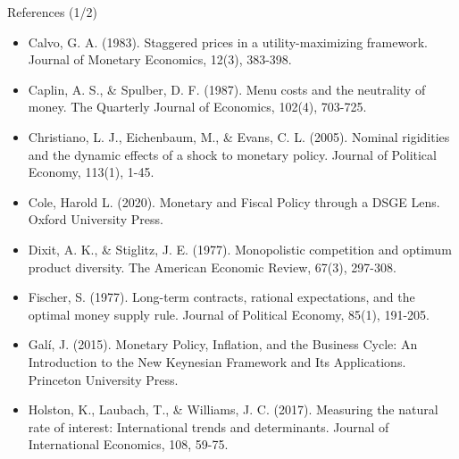 \documentclass[10pt,c,aspectratio=1610,handout]{beamer}
\begin{document}
\begin{frame}{References (1/2)}%
  \begin{scriptsize}%
    \begin{itemize}%
      \item[$\blacktriangleright$] Calvo, G. A. (1983). Staggered prices in a utility-maximizing framework. Journal of Monetary Economics, 12(3), 383-398.%
      \item[$\blacktriangleright$] Caplin, A. S., \& Spulber, D. F. (1987). Menu costs and the neutrality of money. The Quarterly Journal of Economics, 102(4), 703-725.%
      \item[$\blacktriangleright$] Christiano, L. J., Eichenbaum, M., \& Evans, C. L. (2005). Nominal rigidities and the dynamic effects of a shock to monetary policy. Journal of Political Economy, 113(1), 1-45.%
      \item[$\blacktriangleright$] Cole, Harold L. (2020). Monetary and Fiscal Policy through a DSGE Lens. Oxford University Press.%
      \item[$\blacktriangleright$] Dixit, A. K., \& Stiglitz, J. E. (1977). Monopolistic competition and optimum product diversity. The American Economic Review, 67(3), 297-308.%
      \item[$\blacktriangleright$] Fischer, S. (1977). Long-term contracts, rational expectations, and the optimal money supply rule. Journal of Political Economy, 85(1), 191-205.%
      \item[$\blacktriangleright$] Gal\'i, J. (2015). Monetary Policy, Inflation, and the Business Cycle: An Introduction to the New Keynesian Framework and Its Applications. Princeton University Press.%
      \item[$\blacktriangleright$] Holston, K., Laubach, T., \& Williams, J. C. (2017). Measuring the natural rate of interest: International trends and determinants. Journal of International Economics, 108, 59-75.%
    \end{itemize}%
  \end{scriptsize}%
\end{frame}%
\end{document}
